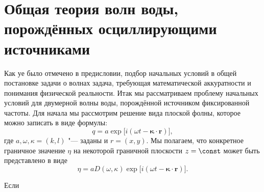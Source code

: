 \newcommand{\eexp}{\exp\big[i(\omega t - \boldsymbol\kappa\cdot \boldsymbol r)\big]}
\section{Общая теория волн воды, порождённых осциллирующими источниками}
Как уе было отмечено в предисловии, подбор начальных условий в общей постановке задачи о волнах задача, требующая математической аккуратности и понимания физической реальности. Итак мы рассматриваем проблему начальных условий для двумерной волны воды, порождённой источником фиксированной частоты. Для начала мы рассмотрим решение вида плоской фолны, которое можно записать в виде формулы:
\[
  q = a \eexp,
\]
где $a, \omega, \kappa = (k, l)$ "--- заданы и $r=(x,y)$. Мы полагаем, что конкретное граничное значение $\eta$ на некоторой граничной плоскости $z=\const$ может быть представлено в виде
\[
  \eta = a D(\omega, \kappa)\eexp.
\]

Если 
